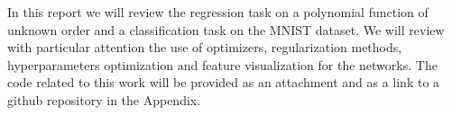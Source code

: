 In this report we will review the regression task on a polynomial function of unknown order and a classification task on 
the MNIST dataset. We will review with particular attention the use of optimizers, regularization methods, hyperparameters
optimization and feature visualization for the networks. The code related to this work will be provided as an attachment
and as a link to a github repository in the Appendix.